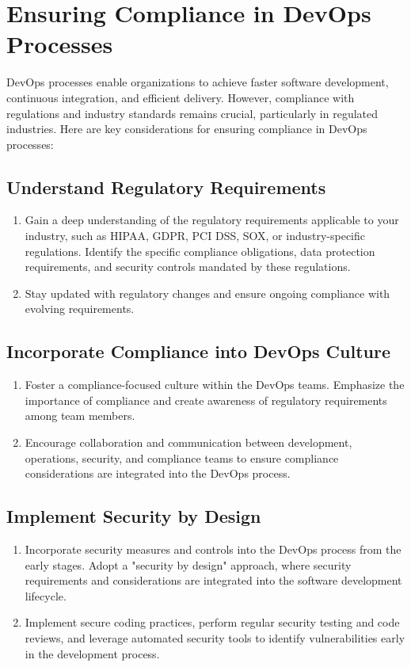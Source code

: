 \chapter*{Ensuring Compliance in DevOps Processes}

DevOps processes enable organizations to achieve faster software development, continuous integration, and efficient delivery. However, compliance with regulations and industry standards remains crucial, particularly in regulated industries. Here are key considerations for ensuring compliance in DevOps processes:

\section*{Understand Regulatory Requirements}
\begin{enumerate}
    \item Gain a deep understanding of the regulatory requirements applicable to your industry, such as HIPAA, GDPR, PCI DSS, SOX, or industry-specific regulations. Identify the specific compliance obligations, data protection requirements, and security controls mandated by these regulations.

    \item Stay updated with regulatory changes and ensure ongoing compliance with evolving requirements.
\end{enumerate}

\section*{Incorporate Compliance into DevOps Culture}
\begin{enumerate}
    \item Foster a compliance-focused culture within the DevOps teams. Emphasize the importance of compliance and create awareness of regulatory requirements among team members.

    \item Encourage collaboration and communication between development, operations, security, and compliance teams to ensure compliance considerations are integrated into the DevOps process.
\end{enumerate}

\section*{Implement Security by Design}
\begin{enumerate}
    \item Incorporate security measures and controls into the DevOps process from the early stages. Adopt a "security by design" approach, where security requirements and considerations are integrated into the software development lifecycle.

    \item Implement secure coding practices, perform regular security testing and code reviews, and leverage automated security tools to identify vulnerabilities early in the development process.
\end{enumerate}

